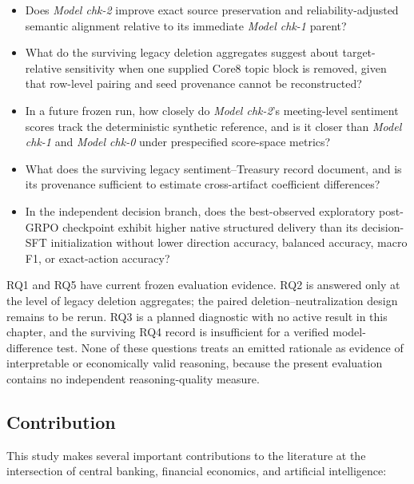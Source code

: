 \begin{itemize}
\item[1.] Does \textit{Model chk-2} improve exact source preservation and
reliability-adjusted semantic alignment relative to its immediate
\textit{Model chk-1} parent?

\item[2.] What do the surviving legacy deletion aggregates suggest about
target-relative sensitivity when one supplied Core8 topic block is removed,
given that row-level pairing and seed provenance cannot be reconstructed?

\item[3.] In a future frozen run, how closely do \textit{Model chk-2}'s
meeting-level sentiment scores track the deterministic synthetic reference,
and is it closer than \textit{Model chk-1} and \textit{Model chk-0} under
prespecified score-space metrics?

\item[4.] What does the surviving legacy sentiment--Treasury record document,
and is its provenance sufficient to estimate cross-artifact coefficient
differences?

\item[5.] In the independent decision branch, does the best-observed
exploratory post-GRPO checkpoint exhibit higher native structured delivery than
its decision-SFT initialization without lower direction accuracy, balanced
accuracy, macro F1, or exact-action accuracy?
\end{itemize}

RQ1 and RQ5 have current frozen evaluation evidence. RQ2 is answered only at
the level of legacy deletion aggregates; the paired deletion--neutralization
design remains to be rerun. RQ3 is a planned diagnostic with no active result
in this chapter, and the surviving RQ4 record is insufficient for a verified
model-difference test. None of these questions treats an emitted rationale as
evidence of interpretable or economically valid reasoning, because the
present evaluation contains no independent reasoning-quality measure.


\subsection*{Contribution}

This study makes several important contributions to the literature at the intersection of central banking, financial economics, and artificial intelligence:

